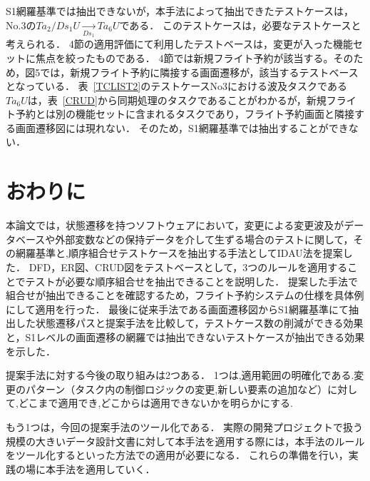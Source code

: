 \documentclass[a4paper,12pt]{jreport}
\begin{document}
S1網羅基準では抽出できないが，本手法によって抽出できたテストケースは，No.3の$Ta_2/Ds_1U  \xrightarrow[Ds_1]{} Ta_6U$である．
このテストケースは，必要なテストケースと考えられる．
4節の適用評価にて利用したテストベースは，変更が入った機能セットに焦点を絞ったものである．
4節では新規フライト予約が該当する。そのため，図5では，新規フライト予約に隣接する画面遷移が，該当するテストベースとなっている．
表~\ref{TCLIST2}のテストケースNo3における波及タスクである$Ta_6U$は，表~\ref{CRUD}から同期処理のタスクであることがわかるが，新規フライト予約とは別の機能セットに含まれるタスクであり，フライト予約画面と隣接する画面遷移図には現れない．
そのため，S1網羅基準では抽出することができない．

\section{おわりに}

本論文では，状態遷移を持つソフトウェアにおいて，変更による変更波及がデータベースや外部変数などの保持データを介して生ずる場合のテストに関して，その網羅基準と,順序組合せテストケースを抽出する手法としてIDAU法を提案した．
DFD，ER図、CRUD図をテストベースとして，3つのルールを適用することでテストが必要な順序組合せを抽出できることを説明した．
提案した手法で組合せが抽出できることを確認するため，フライト予約システムの仕様を具体例にして適用を行った．
最後に従来手法である画面遷移図からS1網羅基準にて抽出した状態遷移パスと提案手法を比較して，テストケース数の削減ができる効果と，S1レベルの画面遷移の網羅では抽出できないテストケースが抽出できる効果を示した．

提案手法に対する今後の取り組みは2つある．
1つは,適用範囲の明確化である.変更のパターン（タスク内の制御ロジックの変更,新しい要素の追加など）に対して,どこまで適用でき,どこからは適用できないかを明らかにする.

もう1つは，今回の提案手法のツール化である．
実際の開発プロジェクトで扱う規模の大きいデータ設計文書に対して本手法を適用する際には，本手法のルールをツール化するといった方法での適用が必要になる．
これらの準備を行い，実践の場に本手法を適用していく．
\end{document}

